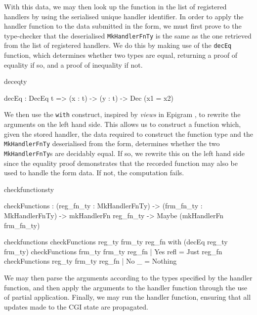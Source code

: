 With this data, we may then look up the function in the list of registered
handlers by using the serialised unique handler identifier. In order to apply
the handler function to the data submitted in the form, we must first prove to
the type-checker that the deserialised \texttt{MkHandlerFnTy} is the same as
the one retrieved from the list of registered handlers. We do this by making
use of the \texttt{decEq} function, which determines whether two types are
equal, returning a proof of equality if so, and a proof of inequality if not.

\begin{SaveVerbatim}{deceqty}

decEq : DecEq t => (x : t) -> (y : t) -> Dec (x1 = x2)

\end{SaveVerbatim}

We then use the \texttt{with} construct, inspired by
\textit{views} in Epigram \cite{mcbride.mckinna:viewfromleft}, to rewrite the
arguments on the left hand side. This allows us to construct a function which,
given the stored handler, the data required to
construct the function type and the \texttt{MkHandlerFnTy} deserialised from
the form, determines whether the two \texttt{MkHandlerFnTy}s are decidably
equal. If so, we rewrite this on the left hand side since the equality proof
demonstrates that the recorded function may also be used to handle the form
data. If not, the computation fails.

\begin{SaveVerbatim}{checkfunctionsty}

checkFunctions : (reg_fn_ty : MkHandlerFnTy) -> 
                 (frm_fn_ty : MkHandlerFnTy) -> 
                 mkHandlerFn reg_fn_ty -> 
                 Maybe (mkHandlerFn frm_fn_ty)
\end{SaveVerbatim}

\begin{SaveVerbatim}{checkfunctions}
checkFunctions reg_ty frm_ty reg_fn with 
                             (decEq reg_ty frm_ty)
  checkFunctions frm_ty frm_ty reg_fn 
                        | Yes refl = Just reg_fn
  checkFunctions reg_ty frm_ty reg_fn 
                        | No _ = Nothing

\end{SaveVerbatim}



\noindent
We may then parse the arguments according to the types specified by the handler
function, and then apply the arguments to the handler function through the use
of partial application. Finally, we may run the handler function, ensuring that
all updates made to the CGI state are propagated.


